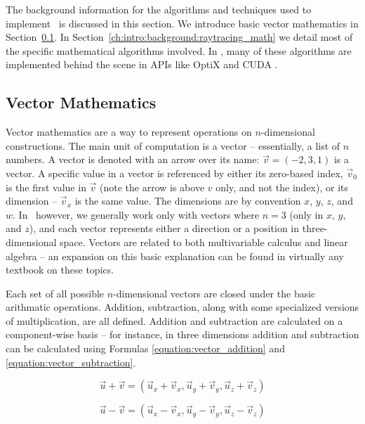 The background information for the algorithms and techniques used to implement \name\ is discussed in this section.
We introduce basic vector mathematics in Section~\ref{ch:intro:background:vector_math}.
In Section~\ref{ch:intro:background:raytracing_math} we detail most of the specific mathematical algorithms involved.
In \name, many of these algorithms are implemented behind the scene in APIs like OptiX and CUDA .

\subsection{Vector Mathematics}
\label{ch:intro:background:vector_math}

Vector mathematics are a way to represent operations on $n$-dimensional constructions.
The main unit of computation is a vector -- essentially, a list of $n$ numbers.
A vector is denoted with an arrow over its name: $\vec{v} = (-2, 3, 1)$ is a vector.
A specific value in a vector is referenced by either its zero-based index, $\vec{v}_{0}$ is the first value in $\vec{v}$ (note the arrow is above $v$ only, and not the index), or its dimension -- $\vec{v}_x$ is the same value.
The dimensions are by convention $x$, $y$, $z$, and $w$.
In \name\ however, we generally work only with vectors where $n = 3$ (only in $x$, $y$, and $z$), and each vector represents either a direction or a position in three-dimensional space.
Vectors are related to both multivariable calculus and linear algebra -- an expansion on this basic explanation can be found in virtually any textbook on these topics.


Each set of all possible $n$-dimensional vectors are closed under the basic arithmatic operations.
Addition, subtraction, along with some specialized versions of multiplication, are all defined.
Addition and subtraction are calculated on a component-wise basis -- for instance, in three dimensions addition and subtraction can be calculated using Formulas \ref{equation:vector_addition} and \ref{equation:vector_subtraction}.

\begin{equation}
  \label{equation:vector_addition}
  \vec{u} + \vec{v} = (\vec{u}_x + \vec{v}_x, \vec{u}_y + \vec{v}_y, \vec{u}_z + \vec{v}_z)
\end{equation}

\begin{equation}
  \label{equation:vector_subtraction}
  \vec{u} - \vec{v} = (\vec{u}_x - \vec{v}_x, \vec{u}_y - \vec{v}_y, \vec{u}_z - \vec{v}_z)
\end{equation}

